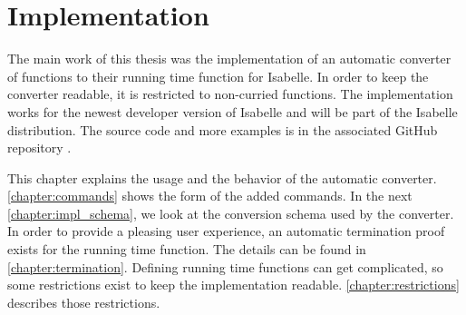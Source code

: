
\chapter{Implementation}\label{chapter:impl}

The main work of this thesis was the implementation of an automatic converter of functions to their running time function for Isabelle.
In order to keep the converter readable, it is restricted to non-curried functions.
The implementation works for the newest developer version of Isabelle and will be part of the Isabelle distribution.
The source code and more examples is in the associated GitHub repository \cite{repo}.

This chapter explains the usage and the behavior of the automatic converter.
\autoref{chapter:commands} shows the form of the added commands.
In the next \autoref{chapter:impl_schema}, we look at the conversion schema used by the converter.
In order to provide a pleasing user experience, an automatic termination proof exists for the running time function.
The details can be found in \autoref{chapter:termination}.
Defining running time functions can get complicated, so some restrictions exist to keep the implementation readable.
\autoref{chapter:restrictions} describes those restrictions.






